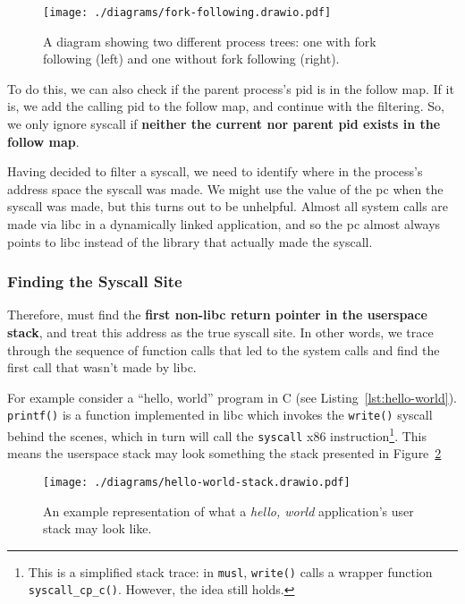 \begin{figure}[ht]
    \centering
    \texttt{[image: ./diagrams/fork-following.drawio.pdf]} 
    \caption{A diagram showing two different process trees: one with fork
    following (left) and one without fork following (right).}
    \label{fig:fork-follow-process-tree}
\end{figure}


To do this, we can also check if the parent process's \ac{pid} is in the follow
map. If it is, we add the calling \ac{pid} to the follow map, and continue with
the filtering. So, we only ignore syscall if \textbf{neither the current nor
parent \ac{pid} exists in the follow map}.

Having decided to filter a syscall, we need to identify where in the process's
address space the syscall was made. We might use the value of the \ac{pc} when
the syscall was made, but this turns out to be unhelpful.
Almost all system calls are made via \ac{libc} in a dynamically linked 
application, and so the \ac{pc} almost always points to \ac{libc} instead of the
library that actually made the syscall.

\subsubsection{Finding the Syscall Site}\label{subsubsec:find_syscall}

Therefore, \af must find the \textbf{first non-\ac{libc} return pointer in the
userspace stack}, and treat this address as the true syscall site. In other
words, we trace through the sequence of function calls that led to the system
calls and find the first call that wasn't made by libc.

For example consider a ``hello, world'' program in C (see Listing~\ref{lst:hello-world}). \texttt{printf()} is a 
function implemented in \ac{libc} which invokes the \texttt{write()} syscall
behind the scenes, which in turn will call the \texttt{syscall} x86
instruction\footnote{This is a simplified stack trace: in \texttt{musl},
\texttt{write()} calls a wrapper function \texttt{syscall\_cp\_c()}. However,
the idea still holds.}. This means the userspace stack may look something the stack
presented in Figure~\ref{fig:hello-world-stack}


\begin{figure}[ht]
    \centering
    \texttt{[image: ./diagrams/hello-world-stack.drawio.pdf]} 
    \caption{An example representation of what a \textit{hello, world}
    application's user stack may look like.}
    \label{fig:hello-world-stack}
\end{figure}

